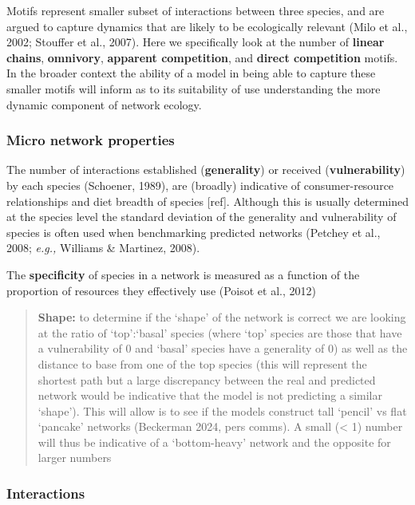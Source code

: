 \documentclass[
]{article}
\begin{document}
Motifs represent smaller subset of interactions between three species,
and are argued to capture dynamics that are likely to be ecologically
relevant (Milo et al., 2002; Stouffer et al., 2007). Here we
specifically look at the number of \textbf{linear chains},
\textbf{omnivory}, \textbf{apparent competition}, and \textbf{direct
competition} motifs. In the broader context the ability of a model in
being able to capture these smaller motifs will inform as to its
suitability of use understanding the more dynamic component of network
ecology.

\subsubsection{Micro network properties}\label{micro-network-properties}

The number of interactions established (\textbf{generality}) or received
(\textbf{vulnerability}) by each species (Schoener, 1989), are (broadly)
indicative of consumer-resource relationships and diet breadth of
species {[}ref{]}. Although this is usually determined at the species
level the standard deviation of the generality and vulnerability of
species is often used when benchmarking predicted networks (Petchey et
al., 2008; \emph{e.g.,} Williams \& Martinez, 2008).

The \textbf{specificity} of species in a network is measured as a
function of the proportion of resources they effectively use (Poisot et
al., 2012)

\begin{quote}
\textbf{Shape:} to determine if the `shape' of the network is correct we
are looking at the ratio of `top':`basal' species (where `top' species
are those that have a vulnerability of 0 and `basal' species have a
generality of 0) as well as the distance to base from one of the top
species (this will represent the shortest path but a large discrepancy
between the real and predicted network would be indicative that the
model is not predicting a similar `shape'). This will allow is to see if
the models construct tall `pencil' vs flat `pancake' networks (Beckerman
2024, pers comms). A small (\textless{} 1) number will thus be
indicative of a `bottom-heavy' network and the opposite for larger
numbers
\end{quote}

\subsubsection{Interactions}\label{interactions}
\end{document}
